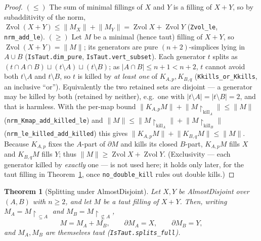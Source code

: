 \documentclass[11pt]{article}
\theoremstyle{plain}
\newtheorem{theorem}{Theorem}[section]
\theoremstyle{definition}
\theoremstyle{remark}
\newcommand{\Zvol}{\operatorname{Zvol}}
\newcommand{\bd}{\partial}
\newcommand{\code}[1]{\texttt{#1}}
\newcommand{\card}[1]{\lvert #1\rvert}
\newcommand{\norm}[1]{\lVert #1\rVert}
\begin{document}
\begin{proof}
$(\le)$ The sum of minimal fillings of $X$ and $Y$ is a filling of $X+Y$, so by subadditivity of
the norm, $\Zvol(X{+}Y)\le\norm{M_X}+\norm{M_Y}=\Zvol X+\Zvol Y$ (\code{Zvol\_le}, \code{nrm\_add\_le}).
$(\ge)$ Let $M$ be a minimal (hence taut) filling of $X+Y$, so $\Zvol(X{+}Y)=\norm M$; its
generators are pure $(n{+}2)$-simplices lying in $A\cup B$ (\code{IsTaut.dim\_pure},
\code{IsTaut.vert\_subset}). Each generator $t$ splits as
$(t\cap A\cap B)\sqcup(t\setminus A)\sqcup(t\setminus B)$; as $\card{A\cap B}\le n+1<n+2$,
$t$ cannot avoid both $t\setminus A$ and $t\setminus B$, so $t$ is killed by \emph{at least
one} of $K_{A,p},K_{B,q}$ (\code{Kkills\_or\_Kkills}, an inclusive ``or''). Equivalently the
two retained sets are disjoint --- a generator may be killed by both (retained by neither),
e.g.\ one with $\card{t\setminus A}=\card{t\setminus B}=2$, and that is harmless. With the
per-map bound $\norm{K_{A,p}M}+\norm{M{\restriction}_{\mathrm{kill}_A}}\le\norm M$
(\code{nrm\_Kmap\_add\_killed\_le}) and
$\norm M\le\norm{M{\restriction}_{\mathrm{kill}_A}}+\norm{M{\restriction}_{\mathrm{kill}_B}}$
(\code{nrm\_le\_killed\_add\_killed}) this gives $\norm{K_{A,p}M}+\norm{K_{B,q}M}\le\norm{M}$.
Because $K_{A,p}$ fixes the $A$-part of $\bd M$ and kills its closed $B$-part, $K_{A,p}M$ fills
$X$ and $K_{B,q}M$ fills $Y$; thus $\norm{M}\ge\Zvol X+\Zvol Y$. (Exclusivity --- each generator
killed by \emph{exactly} one --- is not used here; it holds only later, for the taut filling in
Theorem~\ref{thm:split}, once \code{no\_double\_kill} rules out double kills.)
\end{proof}

\begin{theorem}[Splitting under AlmostDisjoint]\label{thm:split}
Let $X,Y$ be AlmostDisjoint over $(A,B)$ with $n\ge 2$, and let $M$ be a taut filling of
$X+Y$. Then, writing $M_A=M\!\restriction_{\,\subseteq A}$ and
$M_B=M\!\restriction_{\,\not\subseteq A}$,
\[
M=M_A+M_B,\qquad \bd M_A=X,\qquad \bd M_B=Y,
\]
and $M_A,M_B$ are themselves taut (\code{IsTaut.splits\_full}).
\end{theorem}
\end{document}
